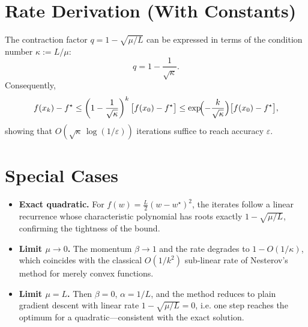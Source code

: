 \documentclass{article}
\begin{document}
\section*{Rate Derivation (With Constants)}
The contraction factor $q=1-\sqrt{\mu/L}$ can be expressed in terms of the condition number $\kappa:=L/\mu$:
\[
q = 1-\frac{1}{\sqrt{\kappa}}.
\]
Consequently,
\[
f(x_k)-f^\star \le \left(1-\frac{1}{\sqrt{\kappa}}\right)^k\bigl[f(x_0)-f^\star\bigr]
\le \exp\!\Bigl(-\frac{k}{\sqrt{\kappa}}\Bigr)\bigl[f(x_0)-f^\star\bigr],
\]
showing that $O(\sqrt{\kappa}\,\log(1/\varepsilon))$ iterations suffice to reach accuracy $\varepsilon$.

\section*{Special Cases}
\begin{itemize}
\item \textbf{Exact quadratic.} For $f(w)=\frac{L}{2}(w-w^\star)^2$, the iterates follow a linear recurrence whose characteristic polynomial has roots exactly $1-\sqrt{\mu/L}$, confirming the tightness of the bound.
\item \textbf{Limit $\mu\to 0$.} The momentum $\beta\to 1$ and the rate degrades to $1-O(1/\kappa)$, which coincides with the classical $O(1/k^2)$ sub‑linear rate of Nesterov’s method for merely convex functions.
\item \textbf{Limit $\mu=L$.} Then $\beta=0$, $\alpha=1/L$, and the method reduces to plain gradient descent with linear rate $1-\sqrt{\mu/L}=0$, i.e. one step reaches the optimum for a quadratic—consistent with the exact solution.
\end{itemize}
\end{document}

